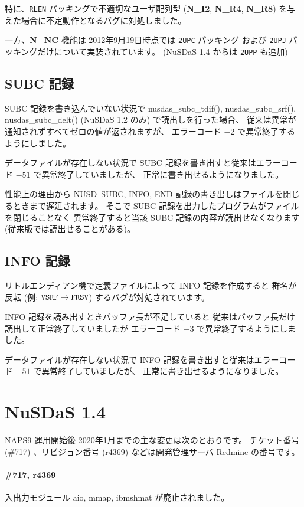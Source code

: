 特に、{\tt RLEN} パッキングで不適切なユーザ配列型
({\bf N\_I2}, {\bf N\_R4}, {\bf N\_R8})
を与えた場合に不定動作となるバグに対処しました。

一方、{\bf N\_NC} 機能は 2012年9月19日時点では {\tt 2UPC} パッキング
および {\tt 2UPJ} パッキングだけについて実装されています。
(NuSDaS 1.4 からは {\tt 2UPP} も追加)

\subsection{SUBC 記録}

SUBC 記録を書き込んでいない状況で
nusdas\_subc\_tdif(),
nusdas\_subc\_srf(),
nusdas\_subc\_delt() (NuSDaS 1.2 のみ)
で読出しを行った場合、
従来は異常が通知されずすべてゼロの値が返されますが、
エラーコード $-2$ で異常終了するようにしました。

データファイルが存在しない状況で
SUBC 記録を書き出すと従来はエラーコード $-51$ で異常終了していましたが、
正常に書き出せるようになりました。

性能上の理由から
NUSD--SUBC, INFO, END 記録の書き出しはファイルを閉じるときまで遅延されます。
そこで SUBC 記録を出力したプログラムがファイルを閉じることなく
異常終了すると当該 SUBC 記録の内容が読出せなくなります
(従来版では読出せることがある)。

\subsection{INFO 記録}

リトルエンディアン機で定義ファイルによって INFO 記録を作成すると
群名が反転 (例: ${\tt VSRF} \to {\tt FRSV}$) するバグが対処されています。

INFO 記録を読み出すときバッファ長が不足していると
従来はバッファ長だけ読出して正常終了していましたが
エラーコード $-3$ で異常終了するようにしました。

データファイルが存在しない状況で
INFO 記録を書き出すと従来はエラーコード $-51$ で異常終了していましたが、
正常に書き出せるようになりました。

\section{NuSDaS 1.4}
\label{changes14}

NAPS9 運用開始後 2020年1月までの主な変更は次のとおりです。
チケット番号 (\#717) 、リビジョン番号 (r4369) などは開発管理サーバ Redmine の番号です。

\paragraph{\#717, r4369}
入出力モジュール aio, mmap, ibmshmat が廃止されました。

